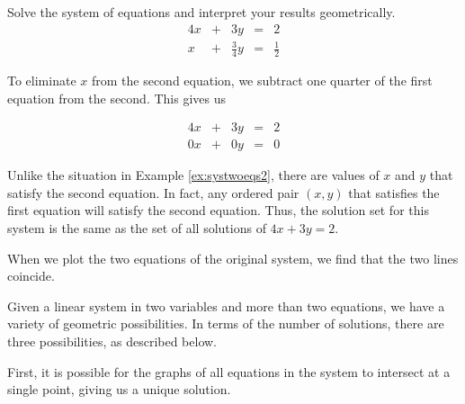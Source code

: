 \documentclass{ximera}
\begin{document}
\begin{example}\label{ex:systwoeqs3infmany} Solve the system of equations and interpret your results geometrically.
$$\begin{array}{ccccc}
      4x & +&3y&= &2 \\
	 x& +&\frac{3}{4}y&=&\frac{1}{2}
    \end{array}$$

\begin{explanation}
To eliminate $x$ from the second equation, we subtract one quarter of the first equation from the second.  This gives us

$$\begin{array}{ccccc}
      4x & +&3y&= &2 \\
	 0x& +&0y&=&0
    \end{array}$$
    
Unlike the situation in Example \ref{ex:systwoeqs2}, there are values of $x$ and $y$ that satisfy the second equation.  In fact, any ordered pair $(x, y)$ that satisfies the first equation will satisfy the second equation.  Thus, the solution set for this system is the same as the set of all solutions of $4x+3y=2$.  

When we plot the two equations of the original system, we find that the two lines coincide.


    \begin{center}
\end{center}
\end{explanation}
\end{example}

Given a linear system in two variables and more than two equations, we have a variety of geometric possibilities.  In terms of the number of solutions, there are three possibilities, as described below. 

First, it is possible for the graphs of all equations in the system to intersect at a single point, giving us a unique solution.  

\begin{center}
\end{center}
\end{document}

